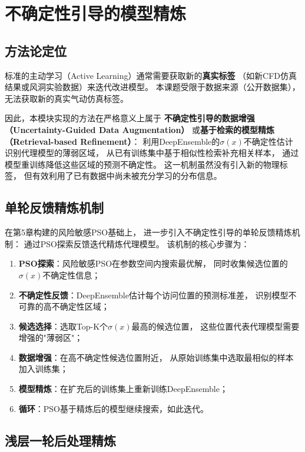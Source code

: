\section{不确定性引导的模型精炼}

\subsection{方法论定位}

标准的主动学习（Active Learning）通常需要获取新的\textbf{真实标签}
（如新CFD仿真结果或风洞实验数据）来迭代改进模型。
本课题受限于数据来源（公开数据集），
无法获取新的真实气动仿真标签。

因此，本模块实现的方法在严格意义上属于
\textbf{不确定性引导的数据增强（Uncertainty-Guided Data Augmentation）}
或\textbf{基于检索的模型精炼（Retrieval-based Refinement）}：
利用DeepEnsemble的$\sigma(x)$不确定性估计
识别代理模型的薄弱区域，
从已有训练集中基于相似性检索补充相关样本，
通过模型重训练降低这些区域的预测不确定性。
这一机制虽然没有引入新的物理标签，
但有效利用了已有数据中尚未被充分学习的分布信息。

\subsection{单轮反馈精炼机制}

在第5章构建的风险敏感PSO基础上，
进一步引入不确定性引导的单轮反馈精炼机制：
通过PSO探索反馈迭代精炼代理模型。
该机制的核心步骤为：

\begin{enumerate}
    \item \textbf{PSO探索}：风险敏感PSO在参数空间内搜索最优解，
        同时收集候选位置的$\sigma(x)$不确定性信息；
    \item \textbf{不确定性反馈}：DeepEnsemble估计每个访问位置的预测标准差，
        识别模型不可靠的高不确定性区域；
    \item \textbf{候选选择}：选取Top-K个$\sigma(x)$最高的候选位置，
        这些位置代表代理模型需要增强的"薄弱区"；
    \item \textbf{数据增强}：在高不确定性候选位置附近，
        从原始训练集中选取最相似的样本加入训练集；
    \item \textbf{模型精炼}：在扩充后的训练集上重新训练DeepEnsemble；
    \item \textbf{循环}：PSO基于精炼后的模型继续搜索，如此迭代。
\end{enumerate}

\subsection{浅层一轮后处理精炼}

